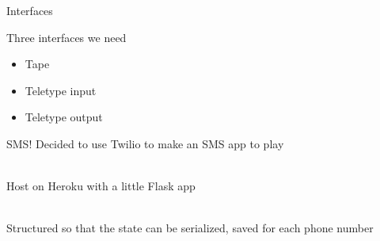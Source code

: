 \documentclass{beamer}
\begin{document}
\begin{frame}{Interfaces}

Three interfaces we need

\begin{itemize}
  \item Tape
  \item Teletype input
  \item Teletype output
\end{itemize}
\end{frame}
\begin{frame}{SMS!}
Decided to use Twilio to make an SMS app to play

\ \\

Host on Heroku with a little Flask app

\ \\

Structured so that the state can be serialized, saved for each phone number
\end{frame}
\end{document}
